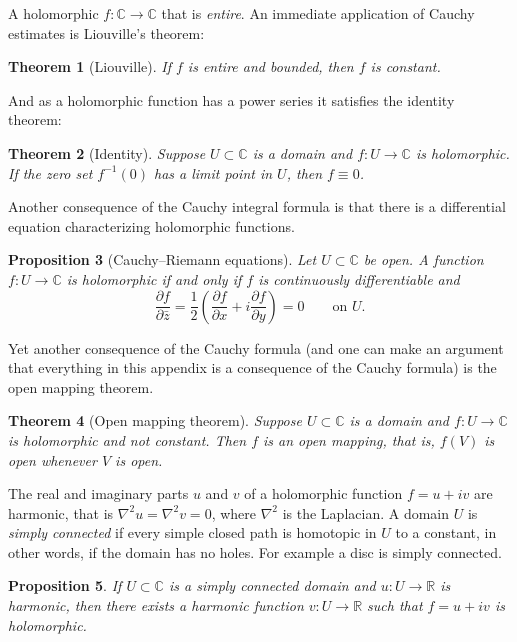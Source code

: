 \documentclass[12pt,openany]{book}
\newcommand{\C}{{\mathbb{C}}}
\newcommand{\R}{{\mathbb{R}}}
\newcommand{\myindex}[1]{#1\index{#1}}
\theoremstyle{plain}
\newtheorem{thm}{Theorem}[section]
\newtheorem{prop}[thm]{Proposition}
\theoremstyle{remark}
\theoremstyle{definition}
\theoremstyle{exercise}
\theoremstyle{example}
\begin{document}
A holomorphic $f \colon \C \to \C$ that is
\emph{\myindex{entire}}.  An immediate application of Cauchy estimates
is Liouville's theorem:

\begin{thm}[Liouville]
If $f$ is entire and bounded, then $f$ is constant.
\end{thm}

And as a holomorphic function has a power series it satisfies the
identity theorem:

\begin{thm}[Identity]
Suppose $U \subset \C$ is a domain and $f \colon U \to \C$ is holomorphic.
If the zero set $f^{-1}(0)$ has a limit point in $U$, then
$f \equiv 0$.
\end{thm}

Another consequence  of the Cauchy integral formula is that there is
a differential equation characterizing holomorphic functions.

\begin{prop}[Cauchy--Riemann equations]
Let $U \subset \C$ be open.
A function $f \colon U \to \C$ is holomorphic if and only if
$f$ is continuously differentiable and
\begin{equation*}
\frac{\partial f}{\partial \bar{z}}
=
\frac{1}{2}
\left(
\frac{\partial f}{\partial x} + i
\frac{\partial f}{\partial y}
\right)
 = 0 \qquad \text{on $U$.}
\end{equation*}
\end{prop}

Yet another consequence of the Cauchy formula (and one can make an argument
that everything in this appendix is a consequence of the Cauchy formula)
is the open mapping theorem.

\begin{thm}[Open mapping theorem]
Suppose $U \subset \C$ is a domain and
$f \colon U \to \C$ is holomorphic and not constant.
Then $f$ is an open mapping, that is,
$f(V)$ is open whenever $V$ is open.
\end{thm}

The real and imaginary parts $u$ and $v$ of a holomorphic function $f =
u+iv$ are harmonic, that is
$\nabla^2 u = \nabla^2 v = 0$, where $\nabla^2$ is the
Laplacian.
A domain $U$ is \emph{\myindex{simply connected}} if every simple closed
path
is homotopic in $U$ to a constant, in other words, if the domain has no
holes.  For example a disc is simply connected.

\begin{prop}
If $U \subset \C$ is a simply connected domain and $u \colon U \to \R$
is harmonic, then there exists a harmonic function $v \colon U \to \R$
such that $f = u+iv$ is holomorphic.
\end{prop}
\end{document}
